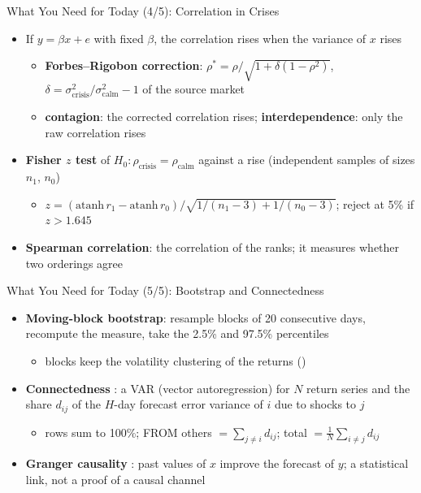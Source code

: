 \begin{frame}{What You Need for Today (4/5): Correlation in Crises}
\itemsize{\small}
\begin{itemize}
    \item If $y = \beta x + e$ with fixed $\beta$, the correlation rises when the variance of $x$ rises 
    \begin{itemize}
        \item \textbf{Forbes--Rigobon correction}: $\rho^* = \rho/\sqrt{1 + \delta(1 - \rho^2)}$, $\delta = \sigma^2_{\text{crisis}}/\sigma^2_{\text{calm}} - 1$ of the source market
        \item \textbf{contagion}: the corrected correlation rises; \textbf{interdependence}: only the raw correlation rises
    \end{itemize}
    \item \textbf{Fisher $z$ test} of $H_0: \rho_{\text{crisis}} = \rho_{\text{calm}}$ against a rise (independent samples of sizes $n_1$, $n_0$)
    \begin{itemize}
        \item $z = (\mathrm{atanh}\,r_1 - \mathrm{atanh}\,r_0)/\sqrt{1/(n_1 - 3) + 1/(n_0 - 3)}$; reject at 5\% if $z > 1.645$
    \end{itemize}
    \item \textbf{Spearman correlation}: the correlation of the ranks; it measures whether two orderings agree
\end{itemize}
\end{frame}

\begin{frame}{What You Need for Today (5/5): Bootstrap and Connectedness}
\itemsize{\small}
\begin{itemize}
    \item \textbf{Moving-block bootstrap}: resample blocks of 20 consecutive days, recompute the measure, take the 2.5\% and 97.5\% percentiles
    \begin{itemize}
        \item blocks keep the volatility clustering of the returns ()
    \end{itemize}
    \item \textbf{Connectedness} : a VAR (vector autoregression) for $N$ return series and the share $d_{ij}$ of the $H$-day forecast error variance of $i$ due to shocks to $j$
    \begin{itemize}
        \item rows sum to 100\%; FROM others $= \sum_{j \ne i} d_{ij}$; total $= \frac1N\sum_{i \ne j} d_{ij}$
    \end{itemize}
    \item \textbf{Granger causality} : past values of $x$ improve the forecast of $y$; a statistical link, not a proof of a causal channel
\end{itemize}
\end{frame}


